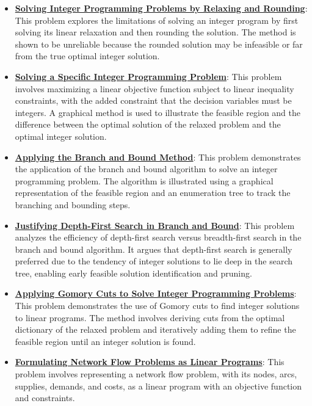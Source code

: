 \documentclass{article}%
\begin{document}
\begin{itemize}[leftmargin=*]
\item \href{https://www.math.purdue.edu/~yipn/421/2024-10-31-IntLinProg.pdf#page=2}{\textbf{Solving Integer Programming Problems by Relaxing and Rounding}}: This problem explores the limitations of solving an integer program by first solving its linear relaxation and then rounding the solution. The method is shown to be unreliable because the rounded solution may be infeasible or far from the true optimal integer solution. %
\item \href{https://www.math.purdue.edu/~yipn/421/2024-10-31-IntLinProg.pdf#page=3}{\textbf{Solving a Specific Integer Programming Problem}}: This problem involves maximizing a linear objective function subject to linear inequality constraints, with the added constraint that the decision variables must be integers. A graphical method is used to illustrate the feasible region and the difference between the optimal solution of the relaxed problem and the optimal integer solution. %
\item \href{https://www.math.purdue.edu/~yipn/421/2024-10-31-IntLinProg.pdf#page=5}{\textbf{Applying the Branch and Bound Method}}: This problem demonstrates the application of the branch and bound algorithm to solve an integer programming problem. The algorithm is illustrated using a graphical representation of the feasible region and an enumeration tree to track the branching and bounding steps. %
\item \href{https://www.math.purdue.edu/~yipn/421/2024-10-31-IntLinProg.pdf#page=11}{\textbf{Justifying Depth{-}First Search in Branch and Bound}}: This problem analyzes the efficiency of depth-first search versus breadth-first search in the branch and bound algorithm. It argues that depth-first search is generally preferred due to the tendency of integer solutions to lie deep in the search tree, enabling early feasible solution identification and pruning. %
\item \href{https://www.math.purdue.edu/~yipn/421/2024-10-31-IntLinProg.pdf#page=15}{\textbf{Applying Gomory Cuts to Solve Integer Programming Problems}}: This problem demonstrates the use of Gomory cuts to find integer solutions to linear programs. The method involves deriving cuts from the optimal dictionary of the relaxed problem and iteratively adding them to refine the feasible region until an integer solution is found. %
\item \href{https://www.math.purdue.edu/~yipn/421/2024-11-05-NetFlows.pdf#page=1}{\textbf{Formulating Network Flow Problems as Linear Programs}}: This problem involves representing a network flow problem, with its nodes, arcs, supplies, demands, and costs, as a linear program with an objective function and constraints. %

\end{itemize}
\end{document}
